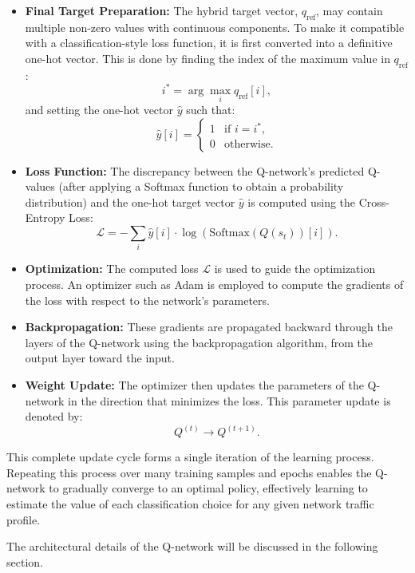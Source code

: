 \documentclass{report}
\begin{document}
\begin{itemize}
    \item \textbf{Final Target Preparation:} The hybrid target vector, $q_{\text{ref}}$, may contain multiple non-zero values with continuous components. To make it compatible with a classification-style loss function, it is first converted into a definitive one-hot vector. This is done by finding the index of the maximum value in $q_{\text{ref}}$:
    \[
    i^* = \arg\max_i q_{\text{ref}}[i],
    \]
    and setting the one-hot vector $\hat{y}$ such that:
    \[
    \hat{y}[i] = \begin{cases}
        1 & \text{if } i = i^*, \\
        0 & \text{otherwise}.
    \end{cases}
    \]

    \item \textbf{Loss Function:} The discrepancy between the Q-network's predicted Q-values (after applying a Softmax function to obtain a probability distribution) and the one-hot target vector $\hat{y}$ is computed using the Cross-Entropy Loss:
    \[
    \mathcal{L} = - \sum_i \hat{y}[i] \cdot \log(\text{Softmax}(Q(s_t))[i]).
    \]

    \item \textbf{Optimization:} The computed loss $\mathcal{L}$ is used to guide the optimization process. An optimizer such as Adam is employed to compute the gradients of the loss with respect to the network's parameters.

    \item \textbf{Backpropagation:} These gradients are propagated backward through the layers of the Q-network using the backpropagation algorithm, from the output layer toward the input.

    \item \textbf{Weight Update:} The optimizer then updates the parameters of the Q-network in the direction that minimizes the loss. This parameter update is denoted by:
    \[
    Q^{(t)} \rightarrow Q^{(t+1)}.
    \]
\end{itemize}

This complete update cycle forms a single iteration of the learning process. Repeating this process over many training samples and epochs enables the Q-network to gradually converge to an optimal policy, effectively learning to estimate the value of each classification choice for any given network traffic profile.

The architectural details of the Q-network will be discussed in the following section.
\end{document}
